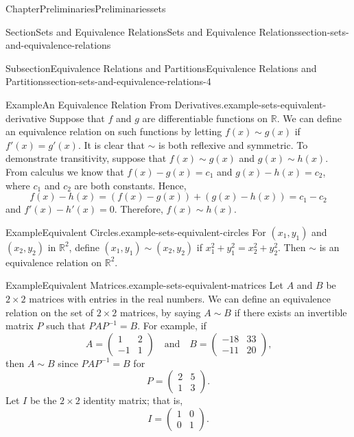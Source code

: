 \documentclass[oneside,10pt,]{book}
\numberwithin{equation}{section}
\begin{document}
\begin{chapterptx}{Chapter}{Preliminaries}{}{Preliminaries}{}{}{sets}
\begin{sectionptx}{Section}{Sets and Equivalence Relations}{}{Sets and Equivalence Relations}{}{}{section-sets-and-equivalence-relations}
\begin{subsectionptx}{Subsection}{Equivalence Relations and Partitions}{}{Equivalence Relations and Partitions}{}{}{section-sets-and-equivalence-relations-4}
\begin{example}{Example}{An Equivalence Relation From Derivatives.}{example-sets-equivalent-derivative}
Suppose that \(f\) and \(g\) are differentiable functions on \({\mathbb R}\).  We can define an equivalence relation on such functions by letting \(f(x) \sim g(x)\) if \(f'(x) = g'(x)\). It is clear that \(\sim\) is both reflexive and symmetric.  To demonstrate transitivity, suppose that \(f(x) \sim g(x)\) and  \(g(x) \sim h(x)\).  From calculus we know that \(f(x) - g(x) = c_1\) and \(g(x)- h(x) = c_2\), where \(c_1\) and \(c_2\) are both constants. Hence,%
\begin{equation*}
f(x) - h(x) = ( f(x) - g(x)) + ( g(x)- h(x))  = c_1 - c_2
\end{equation*}
and \(f'(x) - h'(x) = 0\). Therefore, \(f(x) \sim h(x)\).%
\end{example}
\begin{example}{Example}{Equivalent Circles.}{example-sets-equivalent-circles}%
For \((x_1, y_1 )\) and \((x_2, y_2)\) in \({\mathbb R}^2\), define \((x_1, y_1 ) \sim (x_2, y_2)\) if \(x_1^2 + y_1^2 = x_2^2 + y_2^2\).  Then \(\sim\) is an equivalence relation on \({\mathbb R}^2\).%
\end{example}
\begin{example}{Example}{Equivalent Matrices.}{example-sets-equivalent-matrices}%
Let \(A\) and \(B\) be \(2 \times 2\) matrices with entries in the real numbers. We can define an equivalence relation on the set of \(2 \times 2\) matrices, by saying \(A \sim B\) if there exists an invertible matrix \(P\) such that \(PAP^{-1} = B\).  For example, if%
\begin{equation*}
A =
\begin{pmatrix}
1 & 2 \\
-1 & 1
\end{pmatrix}
\quad \text{and} \quad
B =
\begin{pmatrix}
-18 & 33 \\
-11 & 20
\end{pmatrix}\text{,}
\end{equation*}
then \(A \sim B\) since \(PAP^{-1} = B\) for%
\begin{equation*}
P =
\begin{pmatrix}
2 & 5 \\
1 & 3
\end{pmatrix}\text{.}
\end{equation*}
Let \(I\) be the \(2 \times 2\) identity matrix; that is,%
\begin{equation*}
I =
\begin{pmatrix}
1 & 0 \\
0 & 1
\end{pmatrix}\text{.}

\end{equation*}
\end{example}
\end{subsectionptx}
\end{sectionptx}
\end{chapterptx}
\end{document}
